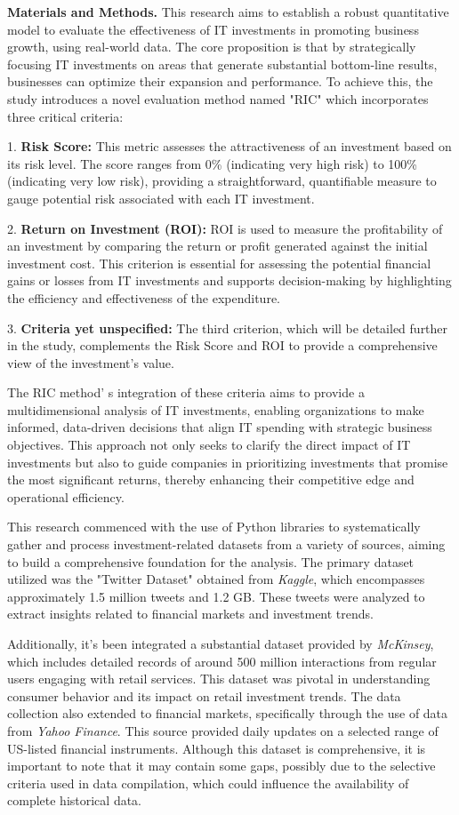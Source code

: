 \begin{multicols}{2}
{\bfseries Materials and Methods.} This research aims to establish a robust
quantitative model to evaluate the effectiveness of IT investments in
promoting business growth, using real-world data. The core proposition
is that by strategically focusing IT investments on areas that generate
substantial bottom-line results, businesses can optimize their expansion
and performance. To achieve this, the study introduces a novel
evaluation method named "RIC" which incorporates three critical
criteria:

1. {\bfseries Risk Score:} This metric assesses the attractiveness of an
investment based on its risk level. The score ranges from 0\%
(indicating very high risk) to 100\% (indicating very low risk),
providing a straightforward, quantifiable measure to gauge potential
risk associated with each IT investment.

2. {\bfseries Return on Investment (ROI):} ROI is used to measure the
profitability of an investment by comparing the return or profit
generated against the initial investment cost. This criterion is
essential for assessing the potential financial gains or losses from
IT investments and supports decision-making by highlighting the
efficiency and effectiveness of the expenditure.

3. {\bfseries Criteria yet unspecified:} The third criterion, which will be
detailed further in the study, complements the Risk Score and ROI to
provide a comprehensive view of the investment's value.

The RIC method' s integration of these criteria aims to
provide a multidimensional analysis of IT investments, enabling
organizations to make informed, data-driven decisions that align IT
spending with strategic business objectives. This approach not only
seeks to clarify the direct impact of IT investments but also to guide
companies in prioritizing investments that promise the most significant
returns, thereby enhancing their competitive edge and operational
efficiency.

This research commenced with the use of Python libraries to
systematically gather and process investment-related datasets from a
variety of sources, aiming to build a comprehensive foundation for the
analysis. The primary dataset utilized was the "Twitter Dataset"
obtained from \emph{Kaggle}, which encompasses approximately 1.5 million
tweets and 1.2 GB. These tweets were analyzed to extract insights
related to financial markets and investment trends.

Additionally, it's been integrated a substantial dataset provided by
\emph{McKinsey}, which includes detailed records of around 500 million
interactions from regular users engaging with retail services. This
dataset was pivotal in understanding consumer behavior and its impact on
retail investment trends. The data collection also extended to financial
markets, specifically through the use of data from \emph{Yahoo Finance}.
This source provided daily updates on a selected range of US-listed
financial instruments. Although this dataset is comprehensive, it is
important to note that it may contain some gaps, possibly due to the
selective criteria used in data compilation, which could influence the
availability of complete historical data.


\end{multicols}
